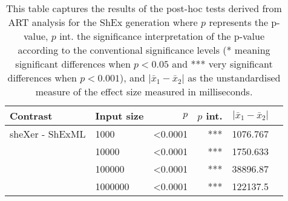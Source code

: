 \documentclass[10pt,a4paper]{article}
\begin{document}
\begin{table}[h]
\centering
\caption{This table captures the results of the post-hoc tests derived from ART analysis for the ShEx generation where $p$ represents the p-value, $p$ int. the significance interpretation of the p-value according to the conventional significance levels (* meaning significant differences when $p < 0.05$ and *** very significant differences when $p < 0.001$), and $|\bar{x}_1 - \bar{x}_2|$ as the unstandardised measure of the effect size measured in milliseconds.}
\begin{tabular}{llrrrr}
Contrast & Input size & $p$ & $p$ int. & $|\bar{x}_1 - \bar{x}_2|$ \\
\hline
sheXer - ShExML & 1000 & \textless 0.0001 & *** & 1076.767 \\
                & 10000 & \textless 0.0001 & *** & 1750.633 \\
                & 100000 & \textless 0.0001 & *** & 38896.87 \\
                & 1000000 & \textless 0.0001 & *** & 122137.5 \\
\hline
\end{tabular}
\label{tab:postHocShEx}
\end{table}
\end{document}
